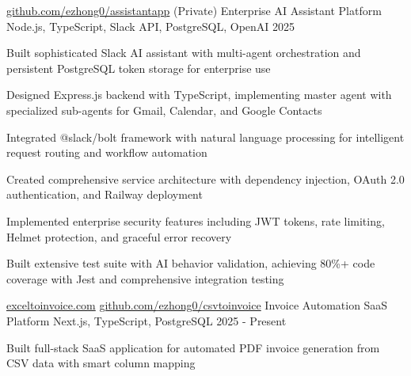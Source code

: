 \documentclass[12pt, letterpaper]{russell}
\begin{document}
\vspace{-0.3cm}
\begin{cventries}
    \cvprojectinline
    {\href{https://github.com/ezhong0/assistantapp}{github.com/ezhong0/assistantapp} (Private)} %
    {Enterprise AI Assistant Platform} %
    {Node.js, TypeScript, Slack API, PostgreSQL, OpenAI} %
    {2025} %
    {
      \begin{cvitems}
        \item {Built sophisticated Slack AI assistant with multi-agent orchestration and persistent PostgreSQL token storage for enterprise use}
        \item {Designed Express.js backend with TypeScript, implementing master agent with specialized sub-agents for Gmail, Calendar, and Google Contacts}
        \item {Integrated @slack/bolt framework with natural language processing for intelligent request routing and workflow automation}
        \item {Created comprehensive service architecture with dependency injection, OAuth 2.0 authentication, and Railway deployment}
        \item {Implemented enterprise security features including JWT tokens, rate limiting, Helmet protection, and graceful error recovery}
        \item {Built extensive test suite with AI behavior validation, achieving 80\%+ code coverage with Jest and comprehensive integration testing}
      \end{cvitems}
    }
    \cvprojectinline
    {\href{exceltoinvoice.com}{exceltoinvoice.com} \textbar{} \href{https://github.com/ezhong0/csvtoinvoice}{github.com/ezhong0/csvtoinvoice}} %
    {Invoice Automation SaaS Platform} %
    {Next.js, TypeScript, PostgreSQL} %
    {2025 - Present} %
    {
      \begin{cvitems}
        \item {Built full-stack SaaS application for automated PDF invoice generation from CSV data with smart column mapping}

\end{cvitems}}
\end{cventries}
\end{document}

